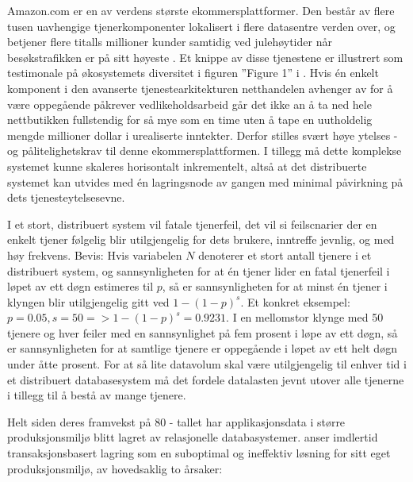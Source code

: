 Amazon.com er en av verdens største ekommersplattformer. Den består av flere tusen uavhengige tjenerkomponenter lokalisert i flere datasentre verden over, og betjener flere titalls millioner kunder samtidig ved julehøytider når besøkstrafikken er på sitt høyeste \citep{pepitone2010}. Et knippe av disse tjenestene er illustrert som testimonale på økosystemets diversitet i figuren ''Figure 1'' i \citep{decandia2007}. Hvis én enkelt komponent i den avanserte tjenestearkitekturen netthandelen avhenger av for å være oppegående påkrever vedlikeholdsarbeid går det ikke an å ta ned hele nettbutikken fullstendig for så mye som en time uten å tape en uutholdelig mengde millioner dollar i urealiserte inntekter. Derfor stilles svært høye ytelses - og pålitelighetskrav til denne ekommersplattformen. I tillegg må dette komplekse systemet kunne skaleres horisontalt inkrementelt, altså at det distribuerte systemet kan utvides med én lagringsnode av gangen med minimal påvirkning på dets tjenesteytelsesevne.

I et stort, distribuert system vil fatale tjenerfeil, det vil si feilscnarier der en enkelt tjener følgelig blir utilgjengelig for dets brukere, inntreffe jevnlig, og med høy frekvens. Bevis: Hvis variabelen \(N\) denoterer et stort antall tjenere i et distribuert system, og sannsynligheten for at én tjener lider en fatal tjenerfeil i løpet av ett døgn estimeres til \(p\), så er sannsynligheten for at minst én tjener i klyngen blir utilgjengelig gitt ved \(1-(1-p)^s\). Et konkret eksempel: \(p=0.05, s=50 => 1-(1-p)^s=0.9231\). I en mellomstor klynge med 50 tjenere og hver feiler med en sannsynlighet på fem prosent i løpe av ett døgn, så er sannsynligheten for at samtlige tjenere er oppegående i løpet av ett helt døgn under åtte prosent. For at så lite datavolum skal være utilgjengelig til enhver tid i et distribuert databasesystem må det fordele datalasten jevnt utover alle tjenerne i tillegg til å bestå av mange tjenere.

Helt siden deres framvekst på 80 - tallet har applikasjonsdata i større produksjonsmiljø blitt lagret av relasjonelle databasystemer. \cite{decandia2007} anser imdlertid transaksjonsbasert lagring som en suboptimal og ineffektiv løsning for sitt eget produksjonsmiljø, av hovedsaklig to årsaker:


